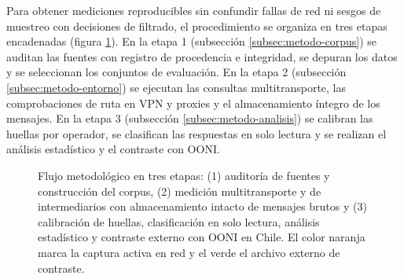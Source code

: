 \documentclass[10pt,a4paper]{article}
\begin{document}
Para obtener mediciones reproducibles sin confundir fallas de red ni sesgos de muestreo con decisiones de filtrado, el procedimiento se organiza en tres etapas encadenadas (figura \ref{fig:flujo}). En la etapa 1 (subsección \ref{subsec:metodo-corpus}) se auditan las fuentes con registro de procedencia e integridad, se depuran los datos y se seleccionan los conjuntos de evaluación. En la etapa 2 (subsección \ref{subsec:metodo-entorno}) se ejecutan las consultas multitransporte, las comprobaciones de ruta en VPN y proxies y el almacenamiento íntegro de los mensajes. En la etapa 3 (subsección \ref{subsec:metodo-analisis}) se calibran las huellas por operador, se clasifican las respuestas en solo lectura y se realizan el análisis estadístico y el contraste con OONI.

\begin{figure}[H]
\centering
{}
\caption{Flujo metodológico en tres etapas: (1) auditoría de fuentes y construcción del corpus, (2) medición multitransporte y de intermediarios con almacenamiento intacto de mensajes brutos y (3) calibración de huellas, clasificación en solo lectura, análisis estadístico y contraste externo con OONI en Chile. El color naranja marca la captura activa en red y el verde el archivo externo de contraste.}
\label{fig:flujo}
\end{figure}
\end{document}
